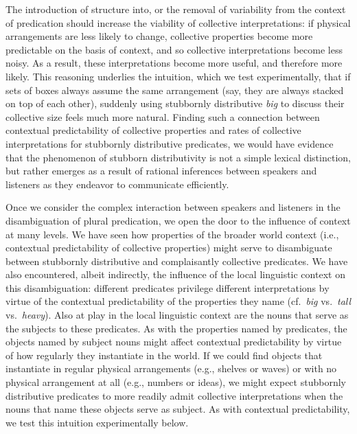 \documentclass[linguex]{sp}
\begin{document}
The introduction of structure into, or the removal of variability from the context of predication should increase the viability of collective interpretations: if physical arrangements are less likely to change, collective properties become more predictable on the basis of context, and so collective interpretations become less noisy. As a result, these interpretations become more useful, and therefore more likely. This reasoning underlies the intuition, which we test experimentally, that if sets of boxes always assume the same arrangement (say, they are always stacked on top of each other), suddenly using stubbornly distributive \emph{big} to discuss their collective size feels much more natural.
Finding such a connection between contextual predictability of collective properties and rates of collective interpretations for stubbornly distributive predicates, we would have evidence that the phenomenon of stubborn distributivity is not a simple lexical distinction, but rather emerges as a result of rational inferences between speakers and listeners as they endeavor to communicate efficiently. %

Once we consider the complex interaction between speakers and listeners in the disambiguation of plural predication, we open the door to the influence of context at many levels. We have seen how properties of the broader world context (i.e., contextual predictability of collective properties) might serve to disambiguate between stubbornly distributive and complaisantly collective predicates. We have also encountered, albeit indirectly, the influence of the local linguistic context on this disambiguation: different predicates privilege different interpretations by virtue of the contextual predictability of the properties they name (cf.~\emph{big} vs.~\emph{tall} vs.~\emph{heavy}). Also at play in the local linguistic context are the nouns that serve as the subjects to these predicates. As with the properties named by  predicates, the objects named by  subject nouns might affect contextual predictability by virtue of how regularly they instantiate in the world. If we could find objects that instantiate in regular physical arrangements (e.g., shelves or waves) or with no physical arrangement at all (e.g., numbers or ideas), we might expect stubbornly distributive predicates to more readily admit collective interpretations when the nouns that name these objects serve as subject. As with contextual predictability, we test this intuition experimentally below.  
\end{document}
